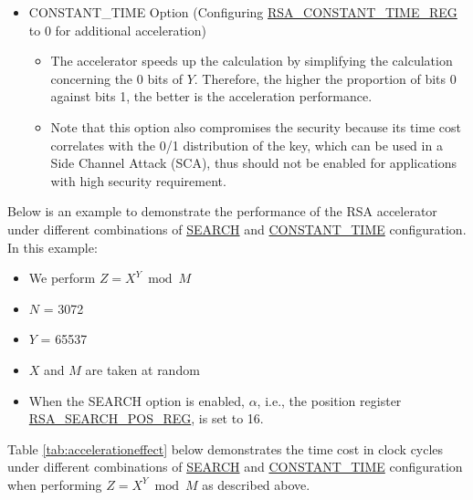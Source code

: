\documentclass[main\_\_EN.tex]{subfiles}
\begin{document}
\begin{itemize}
\item CONSTANT\_TIME Option (Configuring \hyperref[regdesc:RSACONSTANTTIMEREG]{RSA\_CONSTANT\_TIME\_REG} to 0 for additional acceleration)
    \begin{itemize}
        \item The accelerator speeds up the calculation by simplifying the calculation concerning the 0 bits of \begin{math} Y \end{math}. Therefore, the higher the proportion of bits 0 against bits 1, the better is the acceleration performance.
        \item Note that this option also compromises the security because its time cost correlates with the 0/1 distribution of the key, which can be used in a Side Channel Attack (SCA), thus should not be enabled for applications with high security requirement.
    \end{itemize}
\end{itemize}

Below is an example to demonstrate the performance of the RSA accelerator under different combinations of \hyperref[regdesc:RSASEARCHENABLEREG]{SEARCH} and \hyperref[regdesc:RSACONSTANTTIMEREG]{CONSTANT\_TIME} configuration. In this example:
\begin{itemize}
    \item We perform \begin{math}Z = X^{Y} \bmod M\end{math}
    \item \begin{math}N\end{math} = 3072
    \item \begin{math}Y\end{math} = 65537
    \item \begin{math}X\end{math} and \begin{math}M\end{math} are taken at random
    \item When the SEARCH option is enabled, \begin{math} \alpha \end{math}, i.e., the position register \hyperref[regdesc:RSASEARCHPOSREG]{RSA\_SEARCH\_POS\_REG}, is set to 16.
\end{itemize}
Table \ref{tab:accelerationeffect} below demonstrates the time cost in clock cycles under different combinations of \hyperref[regdesc:RSASEARCHENABLEREG]{SEARCH} and \hyperref[regdesc:RSACONSTANTTIMEREG]{CONSTANT\_TIME} configuration when performing \begin{math}Z = X^{Y} \bmod M\end{math} as described above.
\end{document}

